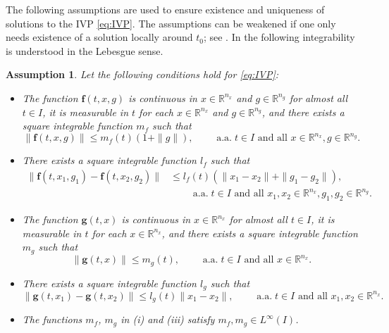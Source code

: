 \documentclass[onefignum,onetabnum]{siamart220329}
\numberwithin{equation}{section}
\newcommand{\aall}{\mbox{ a.a.} \;}
\newcommand {\real} {\mathbb{R}}
\newcommand{\bff}{\ensuremath{\mathbf{f}}} %
\newcommand{\bg}{\ensuremath{\mathbf{g}}} %
\newtheorem{assumption}[theorem]{Assumption}
\begin{document}
The following assumptions are used to ensure existence and uniqueness of solutions to the IVP \cref{eq:IVP}.
The assumptions can be weakened if one only needs existence of a solution locally around $t_0$; see \cite[Sec.~1]{AFFilippov_1988a}.
In the following integrability is understood in the Lebesgue sense.
\begin{assumption} \label{as:IVP_unique_solution}
	Let the following conditions hold for \cref{eq:IVP}:
	
   \begin{itemize}
   \item[(i)]   The function $\bff( t, x, g )$ is continuous in $x \in \real^{n_x}$ and $g  \in \real^{n_g}$ for almost all $t \in I$,
                   it is measurable in $t$ for each $x \in \real^{n_x}$ and $g  \in \real^{n_g}$, and there
                   exists a square integrable function $m_f$ such that $$\| \bff( t, x, g ) \| \le m_f(t) (1 + \| g \|), \qquad \aall t \in I \mbox{ and all } x \in \real^{n_x}, g \in \real^{n_g}. $$ 
   \item[(ii)]   There exists a square integrable function $l_f$ such that 
   \begin{align*}
   \| \bff( t, x_1, g_1 ) -  \bff( t, x_2, g_2 )  \| &\le l_f(t) ( \| x_1 - x_2  \| + \| g_1 - g_2  \| ), \\ &  \qquad \aall t \in I \mbox{ and all } x_1, x_2 \in \real^{n_x}, g_1, g_2 \in \real^{n_g}.
   \end{align*}
    \item[(iii)]   The function $\bg( t, x )$ is continuous in $x \in \real^{n_x}$ for almost all $t \in I$,
                   it is measurable in $t$ for each $x \in \real^{n_x}$, and there
                   exists a square integrable function $m_g$ such that $$\| \bg( t, x ) \| \le m_g(t), \qquad \aall t \in I \mbox{ and all } x \in \real^{n_x}.$$  
   \item[(iv)]   There exists a square integrable function $l_g$ such that $$\| \bg( t, x_1 ) -  \bg( t, x_2 )  \| \le l_g(t)  \| x_1 - x_2  \|, \qquad \aall t \in I \mbox{ and all } x_1, x_2 \in \real^{n_x}.$$
    \item[(v)]  The functions $m_f$, $m_g$ in (i) and (iii) satisfy $m_f, m_g \in L^\infty(I)$.
\end{itemize}
\end{assumption}
\end{document}
